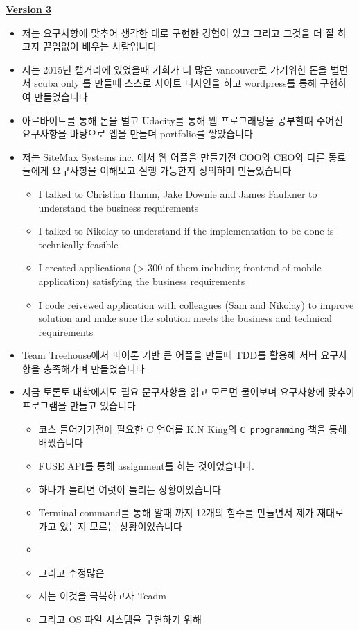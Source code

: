 \documentclass[12pt]{article}
\begin{document}
\begin{itemize}
\begin{itemize}
        \bigskip

        \underline{\textbf{Version 3}}

        \bigskip

        \begin{itemize}
            \item 저는 요구사항에 맞추어 생각한 대로 구현한 경험이 있고 그리고 그것을 더 잘 하고자 끝임없이 배우는 사람입니다
            \item 저는 2015년 캘거리에 있었을때 기회가 더 많은 vancouver로 가기위한 돈을 벌면서 scuba only 를 만들때 스스로 사이트 디자인을 하고 wordpress를 통해 구현하여 만들었습니다
            \item 아르바이트를 통해 돈을 벌고 Udacity를 통해 웹 프로그래밍을 공부할떄 주어진 요구사항을 바탕으로 엡을 만들며 portfolio를 쌓았습니다
            \item 저는 SiteMax Systems inc. 에서 웹 어플을 만들기전 COO와 CEO와 다른 동료들에게 요구사항을 이해보고 실행 가능한지 상의하며 만들었습니다
            \begin{itemize}
                \item I talked to Christian Hamm, Jake Downie and James Faulkner to understand the business requirements
                \item I talked to Nikolay to understand if the implementation to be done is technically feasible
                \item I created applications (> 300 of them including frontend of mobile application) satisfying the business requirements
                \item I code reivewed application with colleagues (Sam and Nikolay) to improve solution and make sure the solution meets the business and technical requirements
            \end{itemize}
            \item Team Treehouse에서 파이톤 기반 큰 어플을 만들때 TDD를 활용해 서버 요구사항을 충족해가며 만들었습니다
            \item 지금 토론토 대학에서도 필요 문구사항을 읽고 모르면 물어보며 요구사항에 맞추어 프로그램을 만들고 있습니다
            \begin{itemize}
                \item 코스 들어가기전에 필요한 C 언어를 K.N King의 \texttt{C programming} 책을 통해 배웠습니다
                \item FUSE API를 통해 assignment를 하는 것이었습니다.
                \item 하나가 틀리면 여럿이 틀리는 상황이었습니다
                \item Terminal command를 통해 알때 까지 12개의 함수를 만들면서 제가 재대로 가고 있는지 모르는 상황이었습니다
                \item
                \item 그리고 수정많은
                \item 저는 이것을 극복하고자 Teadm
                \item 그리고 OS 파일 시스템을 구현하기 위해
            \end{itemize}
        \end{itemize}


\end{itemize}
\end{itemize}
\end{document}
